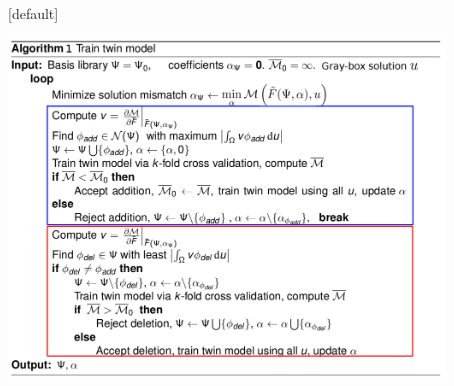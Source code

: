 \documentclass{beamer}
\begin{document}
\setcounter{framenumber}{21}
{
\makeatletter
{}[default] 
\def\beamer@entrycode{\vspace*{-\headheight}} 
\makeatother
\begin{frame}
    \begin{center}
        \includegraphics[height=9cm]{algo2.png}
    \end{center}
\end{frame}
}
%
%
%
\end{document}
